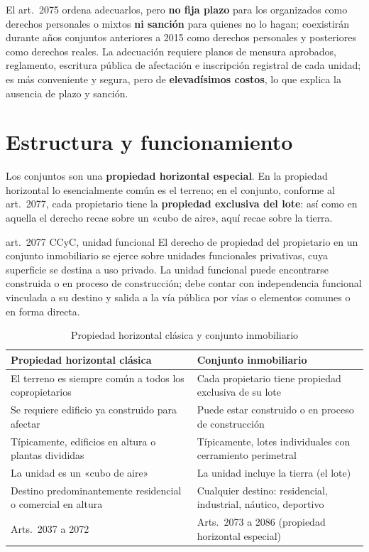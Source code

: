 \documentclass[12pt,oneside]{book}
\begin{document}
El art.~2075 ordena adecuarlos, pero \textbf{no fija plazo} para los organizados como derechos personales o mixtos \textbf{ni sanción} para quienes no lo hagan; coexistirán durante años conjuntos anteriores a 2015 como derechos personales y posteriores como derechos reales. La adecuación requiere planos de mensura aprobados, reglamento, escritura pública de afectación e inscripción registral de cada unidad; es más conveniente y segura, pero de \textbf{elevadísimos costos}, lo que explica la ausencia de plazo y sanción.

\section{Estructura y funcionamiento}

Los conjuntos son una \textbf{propiedad horizontal especial}. En la propiedad horizontal lo esencialmente común es el terreno; en el conjunto, conforme al art.~2077, cada propietario tiene la \textbf{propiedad exclusiva del lote}: así como en aquella el derecho recae sobre un «cubo de aire», aquí recae sobre la tierra.

\begin{regla}{art.~2077 CCyC, unidad funcional}
El derecho de propiedad del propietario en un conjunto inmobiliario se ejerce sobre unidades funcionales privativas, cuya superficie se destina a uso privado. La unidad funcional puede encontrarse construida o en proceso de construcción; debe contar con independencia funcional vinculada a su destino y salida a la vía pública por vías o elementos comunes o en forma directa.
\end{regla}

\begin{table}[H]
\centering
\small
\begin{tabularx}{\textwidth}{>{\raggedright\arraybackslash}X>{\raggedright\arraybackslash}X}
\toprule
\textbf{Propiedad horizontal clásica} & \textbf{Conjunto inmobiliario} \\
\midrule
El terreno es siempre común a todos los copropietarios & Cada propietario tiene propiedad exclusiva de su lote \\
Se requiere edificio ya construido para afectar & Puede estar construido o en proceso de construcción \\
Típicamente, edificios en altura o plantas divididas & Típicamente, lotes individuales con cerramiento perimetral \\
La unidad es un «cubo de aire» & La unidad incluye la tierra (el lote) \\
Destino predominantemente residencial o comercial en altura & Cualquier destino: residencial, industrial, náutico, deportivo \\
Arts.~2037 a 2072 & Arts.~2073 a 2086 (propiedad horizontal especial) \\
\bottomrule
\end{tabularx}
\caption{Propiedad horizontal clásica y conjunto inmobiliario}
\end{table}
\end{document}
